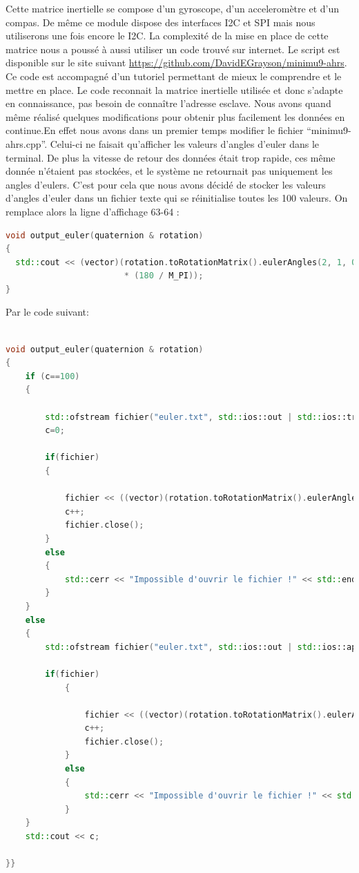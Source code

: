 \documentclass[a4paper,11pt]{report}
\begin{document}
				Cette matrice inertielle se compose d'un gyroscope, d'un acceleromètre et d'un compas. De même ce module dispose des interfaces I2C et SPI mais nous utiliserons une fois encore le I2C. La complexité de la mise en place de cette matrice nous a poussé à aussi utiliser un code trouvé sur internet. Le script est disponible sur le site suivant \url{https://github.com/DavidEGrayson/minimu9-ahrs}. Ce code est accompagné d'un tutoriel permettant de mieux le comprendre et le mettre en place. Le code reconnait la matrice inertielle utilisée et donc s'adapte en connaissance, pas besoin de connaître l'adresse esclave. Nous avons quand même réalisé quelques modifications pour obtenir plus facilement les données en continue.En effet nous avons dans un premier temps modifier le fichier "`minimu9-ahrs.cpp"'. Celui-ci ne faisait qu'afficher les valeurs d'angles d'euler dans le terminal. De plus la vitesse de retour des données était trop rapide, ces même donnée n'étaient pas stockées, et le système ne retournait pas uniquement les angles d'eulers. C'est pour cela que nous avons décidé de stocker les valeurs d'angles d'euler dans un fichier texte qui se réinitialise toutes les 100 valeurs.\newline
				On remplace alors la ligne d'affichage 63-64 :
				\newline 
				\begin{lstlisting}[language=c++]
void output_euler(quaternion & rotation)
{
  std::cout << (vector)(rotation.toRotationMatrix().eulerAngles(2, 1, 0)
                        * (180 / M_PI));
}
				\end{lstlisting}
				\newline
				Par le code suivant:  \newline
				\begin{lstlisting}[language=c++]

void output_euler(quaternion & rotation)
{
	if (c==100)
	{
		
		std::ofstream fichier("euler.txt", std::ios::out | std::ios::trunc);
		c=0;
		
		if(fichier)
		{
				
			fichier << ((vector)(rotation.toRotationMatrix().eulerAngles(2, 1, 0) * (180 / M_PI)))[0] <<'/'<<((vector)(rotation.toRotationMatrix().eulerAngles(2, 1, 0) * (180 / M_PI)))[1]<<'/'<<((vector)(rotation.toRotationMatrix().eulerAngles(2, 1, 0) * (180 / M_PI)))[2] << std::endl;
			c++;
			fichier.close();
		}
		else
		{
			std::cerr << "Impossible d'ouvrir le fichier !" << std::endl;
		}
	}
	else
	{
		std::ofstream fichier("euler.txt", std::ios::out | std::ios::app);
	
		if(fichier)
			{
				
				fichier << ((vector)(rotation.toRotationMatrix().eulerAngles(2, 1, 0) * (180 / M_PI)))[0] <<'/'<<((vector)(rotation.toRotationMatrix().eulerAngles(2, 1, 0) * (180 / M_PI)))[1]<<'/'<<((vector)(rotation.toRotationMatrix().eulerAngles(2, 1, 0) * (180 / M_PI)))[2] << std::endl;
				c++;
				fichier.close();
			}
			else
			{
				std::cerr << "Impossible d'ouvrir le fichier !" << std::endl;
			}
	}
	std::cout << c;
  
}}
				\end{lstlisting}
				
\end{document}
